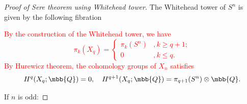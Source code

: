     \begin{proof}[Proof of Sere theorem using Whitehead tower]
        The Whitehead tower of $S^n$ is given by the following fibration
        \begin{center}
        \end{center}
        \textcolor{red}{
        By the construction of the Whitehead tower, we have 
        \begin{equation*}
            \pi_k(X_q) = 
            \begin{cases}
                \pi_k(S^n) &, k\geq q+1; \\
                0 &, k\leq q.
            \end{cases}
        \end{equation*}
        By Hurewicz theorem, the cohomology groups of $X_n$ satisfies
        \begin{equation*}
            H^{q}(X_q;\mbb{Q}) = 0,\quad 
            H^{q+1}(X_q;\mbb{Q}) = \pi_{q+1}(S^n)\otimes\mbb{Q}.
        \end{equation*}
        }

        \noindent If $n$ is odd: 


\end{proof}
